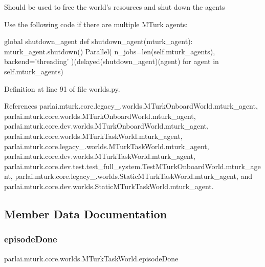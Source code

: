 \begin{DoxyVerb}Should be used to free the world's resources and shut down the agents

Use the following code if there are multiple MTurk agents:

global shutdown_agent
def shutdown_agent(mturk_agent):
    mturk_agent.shutdown()
Parallel(
    n_jobs=len(self.mturk_agents),
    backend='threading'
)(delayed(shutdown_agent)(agent) for agent in self.mturk_agents)
\end{DoxyVerb}
 

Definition at line 91 of file worlds.\+py.



References parlai.\+mturk.\+core.\+legacy\+\_.\+worlds.\+M\+Turk\+Onboard\+World.\+mturk\+\_\+agent, parlai.\+mturk.\+core.\+worlds.\+M\+Turk\+Onboard\+World.\+mturk\+\_\+agent, parlai.\+mturk.\+core.\+dev.\+worlds.\+M\+Turk\+Onboard\+World.\+mturk\+\_\+agent, parlai.\+mturk.\+core.\+worlds.\+M\+Turk\+Task\+World.\+mturk\+\_\+agent, parlai.\+mturk.\+core.\+legacy\+\_.\+worlds.\+M\+Turk\+Task\+World.\+mturk\+\_\+agent, parlai.\+mturk.\+core.\+dev.\+worlds.\+M\+Turk\+Task\+World.\+mturk\+\_\+agent, parlai.\+mturk.\+core.\+dev.\+test.\+test\+\_\+full\+\_\+system.\+Test\+M\+Turk\+Onboard\+World.\+mturk\+\_\+agent, parlai.\+mturk.\+core.\+legacy\+\_.\+worlds.\+Static\+M\+Turk\+Task\+World.\+mturk\+\_\+agent, and parlai.\+mturk.\+core.\+dev.\+worlds.\+Static\+M\+Turk\+Task\+World.\+mturk\+\_\+agent.



\subsection{Member Data Documentation}
\mbox{\label{classparlai_1_1mturk_1_1core_1_1worlds_1_1MTurkTaskWorld_ab54f79ffe393a5c0bb185f61e5809522}} 
\subsubsection{\texorpdfstring{episode\+Done}{episodeDone}}
{\footnotesize\ttfamily parlai.\+mturk.\+core.\+worlds.\+M\+Turk\+Task\+World.\+episode\+Done}



